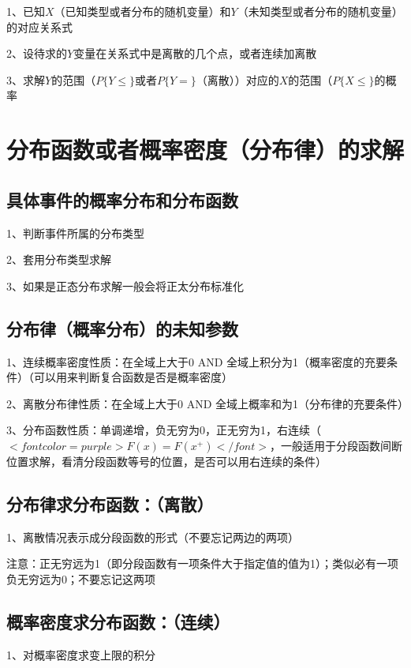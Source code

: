 1、已知$ X $（已知类型或者分布的随机变量）和$ Y $（未知类型或者分布的随机变量）的对应关系式

2、设待求的$ Y $变量在关系式中是离散的几个点，或者连续加离散

3、求解$ Y $的范围（$ P\{Y \leqslant  \} $或者$ P\{Y = \} $（离散））对应的$ X $的范围（$ P\{X\leqslant \} $的概率

\section{分布函数或者概率密度（分布律）的求解}



\subsection{具体事件的概率分布和分布函数}

1、判断事件所属的分布类型

2、套用分布类型求解

3、如果是正态分布求解一般会将正太分布标准化



\subsection{分布律（概率分布）的未知参数}

1、连续概率密度性质：在全域上大于0 AND 全域上积分为1（概率密度的充要条件）（可以用来判断复合函数是否是概率密度）

2、离散分布律性质：在全域上大于0 AND 全域上概率和为1（分布律的充要条件）

3、分布函数性质：单调递增，负无穷为0，正无穷为1，右连续（$ <font color=purple>F(x)=F(x^+)</font> $，一般适用于分段函数间断位置求解，看清分段函数等号的位置，是否可以用右连续的条件）



\subsection{分布律求分布函数：（离散）}

1、离散情况表示成分段函数的形式（不要忘记两边的两项）

注意：正无穷远为1（即分段函数有一项条件大于指定值的值为1）；类似必有一项负无穷远为0；不要忘记这两项



\subsection{概率密度求分布函数：（连续）}

1、对概率密度求变上限的积分

